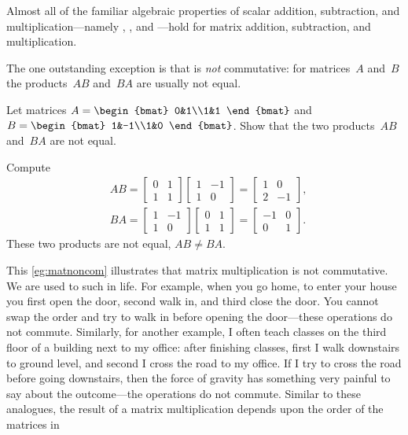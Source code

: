 Almost all of the familiar algebraic properties of scalar addition, 
subtraction, and multiplication---namely , , and ---hold for matrix addition, subtraction, and multiplication.

The one outstanding exception is that  is \emph{not} commutative: for matrices~\(A\) and~\(B\) the products~\(AB\) and~\(BA\) are usually not equal.
\begin{example} \label{eg:matnoncom}
Let matrices \(A=\begin{bmat} 0&1\\1&1 \end{bmat}\) and \(B=\begin{bmat} 1&-1\\1&0 \end{bmat}\).  
Show that the two products~\(AB\) and~\(BA\) are not equal.
\begin{solution} 
Compute
\begin{align*}&
AB=\begin{bmatrix} 0&1\\1&1 \end{bmatrix}
\begin{bmatrix} 1&-1\\1&0 \end{bmatrix}
=\begin{bmatrix} 1&0\\2&-1 \end{bmatrix},
\\&
BA=\begin{bmatrix} 1&-1\\1&0 \end{bmatrix}
\begin{bmatrix} 0&1\\1&1 \end{bmatrix}
=\begin{bmatrix} -1&0\\0&1 \end{bmatrix}.
\end{align*}
These two products are not equal, \(AB\neq BA\).
\end{solution}
\end{example}

This \cref{eg:matnoncom} illustrates that matrix multiplication is not commutative.
We are used to such  in life.
For example, when you go home, to enter your house you first open the door, second walk in, and third close the door. 
You cannot swap the order and try to walk in before opening the door---these operations do not commute.
Similarly, for another example, I often teach classes on the third floor of a building next to my office: after finishing classes, first I walk downstairs to ground level, and second I cross the road to my office.
If I try to cross the road before going downstairs, then the force of gravity has something very painful to say about the outcome---the operations do not commute.
Similar to these analogues, the result of a matrix multiplication depends upon the order of the matrices in 


